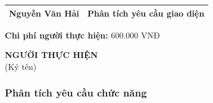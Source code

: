 {\begin{minipage}{\textwidth}
\begin{longtable}{|c|c|}
        \hline
        Nguyễn Văn Hải & Phân tích yêu cầu giao diện \\
        \hline
        \end{longtable}
        \noindent \textbf{Chi phí người thực hiện:} 600.000 VNĐ
        \vspace{1cm}
        \begin{flushleft}
            \hspace{8cm} \textbf{NGƯỜI THỰC HIỆN} \\
            \hspace{9.5cm} (Ký tên) \\
            \vspace{1cm}
        \end{flushleft}
    \end{minipage}
}
\subsubsection{Phân tích yêu cầu chức năng}
